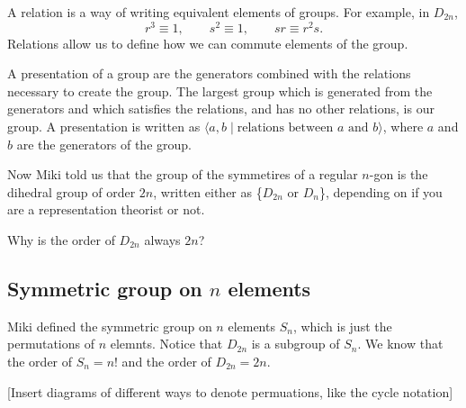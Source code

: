 \begin{definition}[Relations]
A relation is a way of writing equivalent elements of groups. For example, in $D_{2n}$,
\[ r^3 \equiv 1, \qquad s^2 \equiv 1, \qquad sr \equiv r^2s. \]
Relations allow us to define how we can commute elements of the group.
\end{definition}

\begin{definition}[Presentation]
A presentation of a group are the generators combined with the relations necessary to create the group. The largest group which is generated from the generators and which satisfies the relations, and has no other relations, is our group. A presentation is written as $\langle a,b \mid \text{relations between $a$ and $b$} \rangle$, where $a$ and $b$ are the generators of the group.
\end{definition}

Now Miki told us that the group of the  symmetires of a regular $n$-gon is the dihedral group of order $2n$, written either as \{$D_{2n}$ or $D_{n}$\}, depending on if you are a representation theorist or not.

\begin{problem}[HW]
Why is the order of $D_{2n}$ always $2n$?
\end{problem}

\subsection{Symmetric group on \texorpdfstring{$n$}{n} elements}

Miki defined the symmetric group on $n$ elements $S_n$, which is just the permutations of $n$ elemnts. Notice that $D_{2n}$ is a subgroup of $S_n$. We know that the order of $S_n = n!$ and the order of $D_{2n} = 2n$.

[Insert diagrams of different ways to denote permuations, like the cycle notation]
